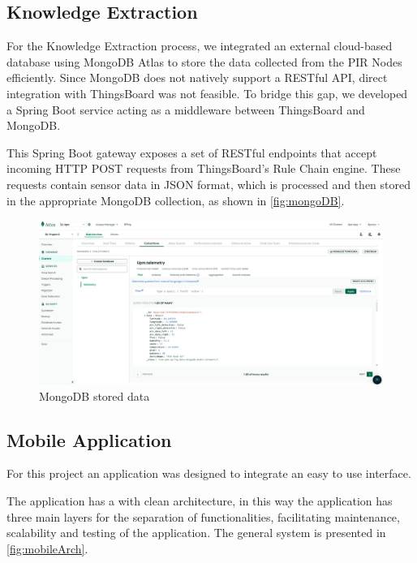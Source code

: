 \subsection{Knowledge Extraction}
For the Knowledge Extraction process, we integrated an external cloud-based database using MongoDB Atlas to store the 
data collected from the PIR Nodes efficiently. Since MongoDB does not natively support a RESTful API, direct integration 
with ThingsBoard was not feasible. To bridge this gap, we developed a Spring Boot service acting as a middleware between 
ThingsBoard and MongoDB.

This Spring Boot gateway exposes a set of RESTful endpoints that accept incoming HTTP POST requests from ThingsBoard’s Rule Chain engine. 
These requests contain sensor data in JSON format, which is processed and then stored in the appropriate MongoDB collection, as shown in \autoref{fig:mongoDB}.

\begin{figure}[H]
    \centering
    \includegraphics[width=1\textwidth]{./images/8/MongoDB.jpg}
    \caption{MongoDB stored data}
    \label{fig:mongoDB}
\end{figure}

\clearpage
\subsection{Mobile Application}

For this project an application was designed to integrate an easy to use interface.

The application has a  with clean architecture, in this way the application has three main layers for the separation of functionalities, facilitating maintenance, scalability and testing of the application. The general system is presented in \autoref{fig:mobileArch}.


